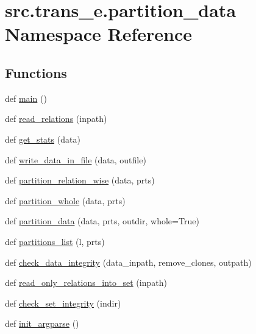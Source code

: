 \hypertarget{namespacesrc_1_1trans__e_1_1partition__data}{}\section{src.\+trans\+\_\+e.\+partition\+\_\+data Namespace Reference}
\label{namespacesrc_1_1trans__e_1_1partition__data}
\subsection*{Functions}
\begin{DoxyCompactItemize}
\item 
def \hyperlink{namespacesrc_1_1trans__e_1_1partition__data_a06a7a10efd18fb71e5a9bb0c9d12f82b}{main} ()
\item 
def \hyperlink{namespacesrc_1_1trans__e_1_1partition__data_a1f8086c2c086b480a54493edc083eb27}{read\+\_\+relations} (inpath)
\item 
def \hyperlink{namespacesrc_1_1trans__e_1_1partition__data_aaf930ea3597efa5649b97002f88bb5e8}{get\+\_\+stats} (data)
\item 
def \hyperlink{namespacesrc_1_1trans__e_1_1partition__data_a63fcfe12d09145efb12b035aa6b69151}{write\+\_\+data\+\_\+in\+\_\+file} (data, outfile)
\item 
def \hyperlink{namespacesrc_1_1trans__e_1_1partition__data_a2d489ec60cdf9d3cace0e493abc7ff48}{partition\+\_\+relation\+\_\+wise} (data, prts)
\item 
def \hyperlink{namespacesrc_1_1trans__e_1_1partition__data_a779432e83ea4d1850f7a5dafff9fda85}{partition\+\_\+whole} (data, prts)
\item 
def \hyperlink{namespacesrc_1_1trans__e_1_1partition__data_ad6122af23ee0a23ae178acdbf627f097}{partition\+\_\+data} (data, prts, outdir, whole=True)
\item 
def \hyperlink{namespacesrc_1_1trans__e_1_1partition__data_ad05c475648ab97a01cd90bd891d68fdb}{partitions\+\_\+list} (l, prts)
\item 
def \hyperlink{namespacesrc_1_1trans__e_1_1partition__data_afd5fc93a56fcdf9137f36a161cd577b1}{check\+\_\+data\+\_\+integrity} (data\+\_\+inpath, remove\+\_\+clones, outpath)
\item 
def \hyperlink{namespacesrc_1_1trans__e_1_1partition__data_aa41d5ffc67334f347cd51a3ca02af48c}{read\+\_\+only\+\_\+relations\+\_\+into\+\_\+set} (inpath)
\item 
def \hyperlink{namespacesrc_1_1trans__e_1_1partition__data_a3d4c4c56815418556d14199e20f0da86}{check\+\_\+set\+\_\+integrity} (indir)
\item 
def \hyperlink{namespacesrc_1_1trans__e_1_1partition__data_aa73a49189afb75f55d27dc6301b88e95}{init\+\_\+argparse} ()
\end{DoxyCompactItemize}


